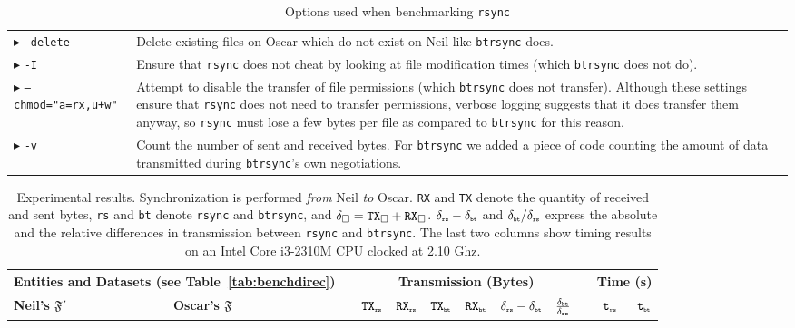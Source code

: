 \documentclass[11pt]{llncs}
\newcommand{\btrsync}{\texttt{btrsync}\xspace}
\newcommand{\rsync}{\texttt{rsync}\xspace}
\begin{document}
\begin{table}
  \begin{tabular}{p{} p{}}
    \toprule
    $\blacktriangleright$ {\tt --delete} & Delete existing files on Oscar which
    do not exist on Neil like \btrsync does.\\
    $\blacktriangleright$ {\tt -I} & Ensure that \rsync does not cheat by
    looking at file modification times (which \btrsync does not do).\\
    $\blacktriangleright$ {\tt --chmod="a=rx,u+w"} & Attempt to disable the
    transfer of file permissions (which \btrsync does not transfer). Although
    these settings ensure that \rsync does not need to transfer permissions,
    verbose logging suggests that it does transfer them anyway, so \rsync must
    lose a few bytes per file as compared to \btrsync for this
    reason.\\
    $\blacktriangleright$ {\tt -v} & Count the number of sent and received
    bytes. For \btrsync we added a piece of code counting the amount of data
    transmitted during \btrsync's own negotiations.\\
    \bottomrule
  \end{tabular}\smallskip
  \caption{Options used when benchmarking \rsync}
  \label{tab:rsyncopt}
\end{table}

\begin{table}
  \setlength{\tabcolsep}{3pt}
  \begin{tabularx}{\textwidth}{ll X r r r r r r X r r }
    \toprule
    \multicolumn{2}{l}{\bf Entities and Datasets (see Table~\ref{tab:benchdirec})} &  &  \multicolumn{6}{c}{\bf Transmission (Bytes)} &  & \multicolumn{2}{r}{\bf Time (s)} \\
    \midrule {\bf Neil's $\mathfrak{F}'$}  & {\bf Oscar's $\mathfrak{F}$}
    & & $\mbox{{\tt TX}}_{\mbox{{\tiny {\tt rs}}}}$ & $\mbox{{\tt RX}}_{\mbox{{\tiny {\tt rs}}}}$  & $\mbox{{\tt TX}}_{\mbox{{\tiny {\tt bt}}}}$  & $\mbox{{\tt RX}}_{\mbox{{\tiny {\tt bt}}}}$  & $\delta_{\mbox{{\tiny {\tt rs}}}}-\delta_{\mbox{{\tiny {\tt bt}}}}$ &
    $\frac{\delta_{\mbox{{\tiny {\tt bt}}}}}{\delta_{\mbox{{\tiny {\tt rs}}}}}$ & & $\mbox{{\tt t}}_{\mbox{{\tiny {\tt rs}}}}$ & $\mbox{{\tt t}}_{\mbox{{\tiny {\tt bt}}}}$ \\\midrule
    
    \bottomrule
  \end{tabularx}\smallskip

  \caption{Experimental results. Synchronization is performed \textit{from} Neil \textit{to} Oscar. {\tt RX} and {\tt TX} denote the quantity of received and sent bytes, {\tt rs} and {\tt bt} denote {\tt rsync} and {\tt btrsync}, and $\delta_{\square}=\mbox{{\tt TX}}_{\square}+\mbox{{\tt RX}}_{\square}$. $\delta_{\mbox{{\tiny {\tt rs}}}}-\delta_{\mbox{{\tiny {\tt bt}}}}$ and ${\delta_{\mbox{{\tiny {\tt bt}}}}}/{\delta_{\mbox{{\tiny {\tt rs}}}}}$ express the absolute and the relative differences in transmission between \rsync and \btrsync. The last two columns show timing results on an Intel Core i3-2310M CPU clocked at 2.10 Ghz.}
  \label{tab:results}
\end{table}
\end{document}

